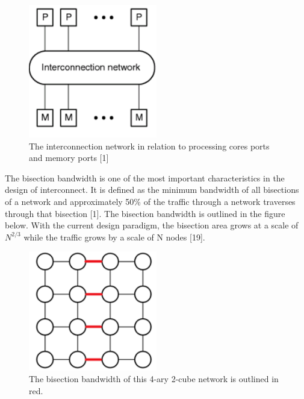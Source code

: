 \documentclass[letterpaper, 10 pt, conference]{ieeeconf}
\begin{document}
\begin{figure}[!ht] %
	\centering
	\includegraphics[width=0.5\textwidth] {Interconnect.png} 
    \caption{The interconnection network in relation to processing cores ports and memory ports [1]}
\end{figure}

The bisection bandwidth is one of the most important characteristics in the design of interconnect.  It is defined as the minimum bandwidth of all bisections of a network and approximately 50\% of the traffic through a network traverses through that bisection [1].  The bisection bandwidth is outlined in the figure below.  With the current design paradigm, the bisection area grows at a scale of $N^{2/3}$ while the traffic grows by a scale of N nodes [19].  

\begin{figure}[!ht] %
	\centering
	\includegraphics [width=0.5\textwidth] {Mesh_Bisection_Bandwidth.png} 
    \caption{The bisection bandwidth of this 4-ary 2-cube network is outlined in red.}
\end{figure}
\end{document}
